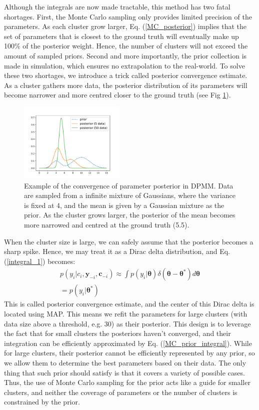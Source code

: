 Although the integrals are now made tractable, this method has two fatal shortages.
First, the Monte Carlo sampling only provides limited precision of the parameters.
As each cluster grow larger, Eq. (\ref{MC_posterior}) implies that the set of parameters that is closest to the ground truth will eventually make up 100\% of the posterior weight.
Hence, the number of clusters will not exceed the amount of sampled priors. 
Second and more importantly, the prior collection is made in simulation, which ensures no extrapolation to the real-world.
To solve these two shortages, we introduce a trick called posterior convergence estimate.
As a cluster gathers more data, the posterior distribution of its parameters will become narrower and more centred closer to the ground truth (see Fig \ref{posterior_convergence}).
\begin{figure}[h]
\centering
\includegraphics[width=0.45\textwidth]{posterior_convergence.pdf}
\caption{Example of the convergence of parameter posterior in DPMM.
Data are sampled from a infinite mixture of Gaussians, where the variance is fixed at 4, and the mean is given by a Gaussian mixture as the prior.
As the cluster grows larger, the posterior of the mean becomes more narrowed and centred at the ground truth (5.5).
}
\label{posterior_convergence}
\end{figure}
%
When the cluster size is large, we can safely assume that the posterior becomes a sharp spike.
Hence, we may treat it as a Dirac delta distribution, and Eq. (\ref{integral_1}) becomes:
\begin{equation}
\begin{gathered}
p(y_i|c_i, \bm{y}_{-i}, \bm{c}_{-i}) \approx 
\int p(y_i|\bm{\theta})
\delta (\bm{\theta} - \bm{\theta}^*)
d\bm{\theta}
\\
= p(y_i|\bm{\theta}^*)
\end{gathered}
\label{posterior_convergence_estimate}
\end{equation}
This is called posterior convergence estimate, and the center of this Dirac delta is located using MAP. 
This means we refit the parameters for large clusters (with data size above a threshold, e.g. 30) as their posterior.
This design is to leverage the fact that for small clusters the posteriors haven't converged, and their integration can be efficiently approximated by Eq. (\ref{MC_prior_integral}).
While for large clusters, their posterior cannot be efficiently represented by any prior, so we allow them to determine the best parameters based on their data.
The only thing that such prior should satisfy is that it covers a variety of possible cases.
Thus, the use of Monte Carlo sampling for the prior acts like a guide for smaller clusters, and neither the coverage of parameters or the number of clusters is constrained by the prior. 


